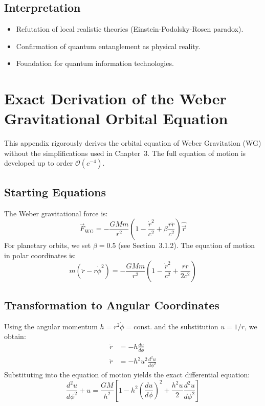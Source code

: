 \subsection{Interpretation}
\begin{itemize}
\item Refutation of local realistic theories (Einstein-Podolsky-Rosen paradox).
\item Confirmation of quantum entanglement as physical reality.
\item Foundation for quantum information technologies.
\end{itemize}

\newpage
\section{Exact Derivation of the Weber Gravitational Orbital Equation}
\label{sec:exact_derivation}

This appendix rigorously derives the orbital equation of Weber Gravitation (WG) without the simplifications used in Chapter~3. The full equation of motion is developed up to order $\mathcal{O}(c^{-4})$.

\subsection{Starting Equations}
The Weber gravitational force is:
\begin{equation}
\vec{F}_{\text{WG}} = -\frac{GMm}{r^2} \left(1 - \frac{\dot{r}^2}{c^2} + \beta \frac{r\ddot{r}}{c^2}\right)\hat{\vec{r}}
\end{equation}
For planetary orbits, we set $\beta = 0.5$ (see Section~3.1.2). The equation of motion in polar coordinates is:
\begin{equation}
m\left(\ddot{r} - r\dot{\phi}^2\right) = -\frac{GMm}{r^2}\left(1 - \frac{\dot{r}^2}{c^2} + \frac{r\ddot{r}}{2c^2}\right)
\end{equation}

\subsection{Transformation to Angular Coordinates}
Using the angular momentum $h = r^2\dot{\phi} = \text{const.}$ and the substitution $u = 1/r$, we obtain:
\begin{align}
\dot{r} &= -h\frac{du}{d\phi} \\
\ddot{r} &= -h^2u^2\frac{d^2u}{d\phi^2}
\end{align}
Substituting into the equation of motion yields the exact differential equation:
\begin{equation}
\frac{d^2u}{d\phi^2} + u = \frac{GM}{h^2}\left[1 - h^2\left(\frac{du}{d\phi}\right)^2 + \frac{h^2u}{2}\frac{d^2u}{d\phi^2}\right]
\end{equation}

